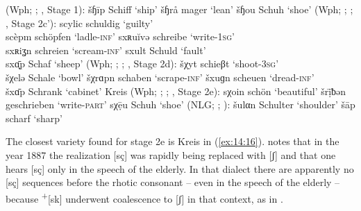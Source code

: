 \ea%
\label{ex:14:13} (Wph; \citealt{Collitz1899}; , Stage 1):
\ea šɧīp \tab [ʃxiːp] \tab Schiff \tab ‘ship’ \label{ex:14:13a}
\ex šɧrå \tab [ʃxʀɑ]  \tab mager  \tab ‘lean’ \label{ex:14:13b}
\ex šɧou \tab [ʃxou]  \tab Schuh  \tab ‘shoe’ \label{ex:14:13c}
\z
\ex%
\label{ex:14:14} (Wph; \citealt{Holthausen1886}; ; , Stage 2c{}'):
\ea\label{ex:14:14a} scylic \tab [sçʏlɪç] \tab schuldig \tab ‘guilty’ \\
    scèpm \tab [sçɛpm̩] \tab schöpfen \tab ‘ladle-\textsc{inf}’ 
\ex\label{ex:14:14b} sxʀuĭvə \tab [sxʀuivə] \tab schreibe \tab ‘write\textsc{{}-1sg}’ \\
    sxʀiʓn \tab [sxʀɪɣn̩] \tab schreien \tab ‘scream\textsc{{}-inf}’ 
\ex\label{ex:14:14c} sxult \tab [sxʊlt] \tab Schuld \tab ‘fault’ \\
    sxɑ̖̄ͅp \tab [sxɔːp] \tab Schaf \tab ‘sheep’ 
  \z
\ex%
\label{ex:14:15} (Wph; \citealt{Arens1908}; ; , Stage 2d):
\ea\label{ex:14:15a} šχyt \tab [ʃçyt] \tab schieβt \tab ‘shoot\textsc{{}-3sg}’ \\
    šχelə \tab  [ʃçɛlə] \tab Schale \tab ‘bowl’ 
\ex\label{ex:14:15b} šχrɑpn \tab [ʃçrɑpn̩] \tab schaben \tab ‘scrape\textsc{{}-inf}’ 
\ex\label{ex:14:15c} šxuɡn \tab [ʃxʊɣn̩] \tab scheuen \tab ‘dread\textsc{{}-inf}’ \\
    šxɑ̄p \tab [ʃxɑːp] \tab Schrank \tab ‘cabinet’ 
\z
\ex%
\label{ex:14:16}Kreis  (Wph; \citealt{Hoffmann1887}; ; , Stage 2e):
\ea\label{ex:14:16a} sχoin \tab [sçoin] \tab schön \tab ‘beautiful’ 
\ex\label{ex:14:16b} šrị̄ƀən \tab [ʃʀiːβən] \tab geschrieben \tab ‘write\textsc{{}-part}’ 
\ex\label{ex:14:16c} sχẹ̄u \tab [sçeːu] \tab Schuh \tab ‘shoe’ 
  \z
\ex%
\label{ex:14:17} (NLG; \citealt{Schmeding1937}; ):
\ea\label{ex:14:17a} šulαn \tab [ʃulɐn] \tab Schulter \tab ‘shoulder’ 
\ex\label{ex:14:17b} šāp \tab [ʃɑːp]  \tab  scharf \tab ‘sharp’ 
  \z
\z 

The closest variety found for stage 2e is Kreis  in (\ref{ex:14:16}). \citet[3]{Hoffmann1887} notes that in the year 1887 the realization [sç] was rapidly being replaced with [ʃ] and that one hears [sç] only in the speech of the elderly. In that dialect there are apparently no [sç] sequences before the rhotic consonant -- even in the speech of the elderly -- because  \textsuperscript{+}[sk] underwent coalescence to [ʃ] in that context, as in .

